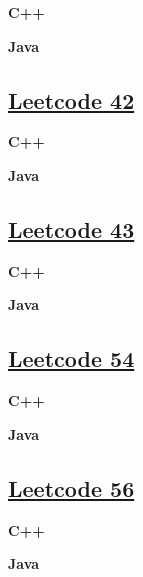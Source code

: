 \textbf{C++}\par


\textbf{Java}\par



\subsection{\href{https://leetcode-cn.com/}{Leetcode 42}}\label{app:codelist:leetcode:42}

\textbf{C++}\par


\textbf{Java}\par



\subsection{\href{https://leetcode-cn.com/}{Leetcode 43}}\label{app:codelist:leetcode:43}

\textbf{C++}\par


\textbf{Java}\par



\subsection{\href{https://leetcode-cn.com/}{Leetcode 54}}\label{app:codelist:leetcode:54}

\textbf{C++}\par


\textbf{Java}\par



\subsection{\href{https://leetcode-cn.com/}{Leetcode 56}}\label{app:codelist:leetcode:56}

\textbf{C++}\par


\textbf{Java}\par



